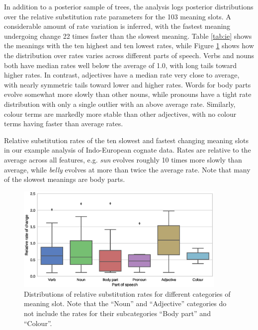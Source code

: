 \documentclass[10pt,a4paper]{article}
\begin{document}
In addition to a posterior sample of trees, the analysis logs posterior distributions over the relative substitution rate parameters for the 103 meaning slots.  A considerable amount of rate variation is inferred, with the fastest meaning undergoing change 22 times faster than the slowest meaning.  Table \ref{tab:ie} shows the meanings with the ten highest and ten lowest rates, while Figure \ref{fig:ie_rates} shows how the distribution over rates varies across different parts of speech.  Verbs and nouns both have median rates well below the average of 1.0, with long tails toward higher rates.  In contrast, adjectives have a median rate very close to average, with nearly symmetric tails toward lower and higher rates.  Words for body parts evolve somewhat more slowly than other nouns, while pronouns have a tight rate distribution with only a single outlier with an above average rate.  Similarly, colour terms are markedly more stable than other adjectives, with no colour terms having faster than average rates.

\begin{table}[t]
	\begin{center}
		
	\end{center}
	\caption{Relative substitution rates of the ten slowest and fastest changing meaning slots in our example analysis of Indo-European cognate data.  Rates are relative to the average across all features, e.g. \emph{sun} evolves roughly 10 times more slowly than average, while \emph{belly} evolves at more than twice the average rate.  Note that many of the slowest meanings are body parts.}
\label{tab:ie}
\end{table}

\begin{figure}[t]
	\begin{center}
	\includegraphics[width=0.90\textwidth]{examples/indoeuropean/category_rates.eps}
	\end{center}
	\caption{Distributions of relative substitution rates for different categories of meaning slot.  Note that the ``Noun'' and ``Adjective'' categories do not include the rates for their subcategories ``Body part'' and ``Colour''.}
\label{fig:ie_rates}
\end{figure}
\end{document}
